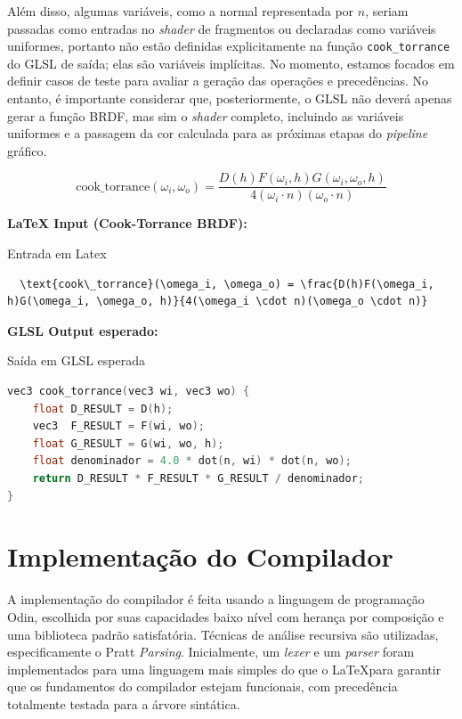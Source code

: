\documentclass[english, 
               brazil, 
               bsc] %
               {dcomp-abntex2}
\begin{document}
Além disso, algumas variáveis, como a normal representada por \( n \), seriam passadas como entradas no \textit{shader} de fragmentos ou declaradas como variáveis uniformes, portanto não estão definidas explicitamente na função \texttt{cook\_torrance} do GLSL de saída; elas são variáveis implícitas. No momento, estamos focados em definir casos de teste para avaliar a geração das operações e precedências. No entanto, é importante considerar que, posteriormente, o GLSL não deverá apenas gerar a função BRDF, mas sim o \textit{shader} completo, incluindo as variáveis uniformes e a passagem da cor calculada para as próximas etapas do \textit{pipeline} gráfico.

\begin{equation} \label{eq-cook-torrance}
  \text{cook\_torrance}(\omega_i, \omega_o) = \frac{D(h)F(\omega_i, h)G(\omega_i, \omega_o, h)}{4(\omega_i \cdot n)(\omega_o \cdot n)}
\end{equation}

\textbf{LaTeX Input (Cook-Torrance BRDF):}
\begin{codigo}[H]
\caption{Entrada em Latex}
\label{cod-input-latex}
\begin{lstlisting}
  \text{cook\_torrance}(\omega_i, \omega_o) = \frac{D(h)F(\omega_i, h)G(\omega_i, \omega_o, h)}{4(\omega_i \cdot n)(\omega_o \cdot n)}
\end{lstlisting}
\end{codigo}

\textbf{GLSL Output esperado:}
\begin{codigo}[H]
\caption{Saída em GLSL esperada}
\label{cod-glsl-esperado}
\begin{lstlisting}[language=C]
vec3 cook_torrance(vec3 wi, vec3 wo) {
    float D_RESULT = D(h);
    vec3  F_RESULT = F(wi, wo);
    float G_RESULT = G(wi, wo, h); 
    float denominador = 4.0 * dot(n, wi) * dot(n, wo);
    return D_RESULT * F_RESULT * G_RESULT / denominador;
}
\end{lstlisting}
\end{codigo}

\section{Implementação do Compilador} \label{compiladorimplementacao}

A implementação do compilador é feita usando a linguagem de programação Odin, escolhida por suas capacidades baixo nível com herança por composição e uma biblioteca padrão satisfatória. Técnicas de análise recursiva são utilizadas, especificamente o Pratt \textit{Parsing}. Inicialmente, um \textit{lexer} e um \textit{parser} foram implementados para uma linguagem mais simples do que o \LaTeX  para garantir que os fundamentos do compilador estejam funcionais, com precedência totalmente testada para a árvore sintática.
\end{document}
